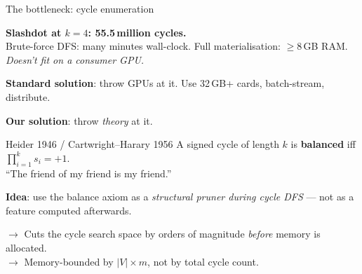 \documentclass[10pt,aspectratio=169]{beamer}
\begin{document}
\begin{frame}{The bottleneck: cycle enumeration}

\textbf{Slashdot at $k{=}4$: 55.5\,million cycles.}\\
Brute-force DFS: many minutes wall-clock. Full materialisation:
$\geq 8$\,GB RAM. \emph{Doesn't fit on a consumer GPU.}

\medskip

\textbf{Standard solution}: throw GPUs at it. Use 32\,GB+ cards,
batch-stream, distribute.

\medskip

\textbf{Our solution}: throw \emph{theory} at it.

\medskip

\begin{block}{Heider 1946 / Cartwright--Harary 1956}
A signed cycle of length $k$ is \textbf{balanced} iff
$\prod_{i=1}^{k} s_i = +1$.\\[2pt]
``The friend of my friend is my friend.''
\end{block}

\smallskip

\textbf{Idea}: use the balance axiom as a \emph{structural pruner
during cycle DFS} --- not as a feature computed afterwards.

\smallskip
$\rightarrow$ Cuts the cycle search space by orders of magnitude
\emph{before} memory is allocated.\\
$\rightarrow$ Memory-bounded by $|V| \times m$, not by total cycle count.
\end{frame}
\end{document}
